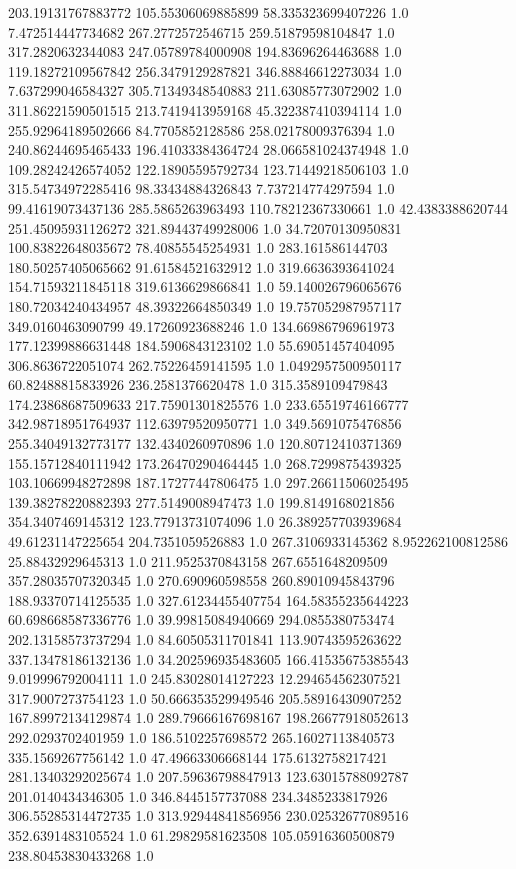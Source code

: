 203.19131767883772	105.55306069885899	58.335323699407226	1.0
7.472514447734682	267.2772572546715	259.51879598104847	1.0
317.2820632344083	247.05789784000908	194.83696264463688	1.0
119.18272109567842	256.3479129287821	346.88846612273034	1.0
7.637299046584327	305.71349348540883	211.63085773072902	1.0
311.86221590501515	213.7419413959168	45.322387410394114	1.0
255.92964189502666	84.7705852128586	258.02178009376394	1.0
240.86244695465433	196.41033384364724	28.066581024374948	1.0
109.28242426574052	122.18905595792734	123.71449218506103	1.0
315.54734972285416	98.33434884326843	7.737214774297594	1.0
99.41619073437136	285.5865263963493	110.78212367330661	1.0
42.4383388620744	251.45095931126272	321.89443749928006	1.0
34.72070130950831	100.83822648035672	78.40855545254931	1.0
283.161586144703	180.50257405065662	91.61584521632912	1.0
319.6636393641024	154.71593211845118	319.6136629866841	1.0
59.140026796065676	180.72034240434957	48.39322664850349	1.0
19.757052987957117	349.0160463090799	49.17260923688246	1.0
134.66986796961973	177.12399886631448	184.5906843123102	1.0
55.69051457404095	306.8636722051074	262.75226459141595	1.0
1.0492957500950117	60.82488815833926	236.2581376620478	1.0
315.3589109479843	174.23868687509633	217.75901301825576	1.0
233.65519746166777	342.98718951764937	112.63979520950771	1.0
349.5691075476856	255.34049132773177	132.4340260970896	1.0
120.80712410371369	155.15712840111942	173.26470290464445	1.0
268.7299875439325	103.10669948272898	187.17277447806475	1.0
297.26611506025495	139.38278220882393	277.5149008947473	1.0
199.8149168021856	354.3407469145312	123.77913731074096	1.0
26.389257703939684	49.61231147225654	204.7351059526883	1.0
267.3106933145362	8.952262100812586	25.88432929645313	1.0
211.9525370843158	267.6551648209509	357.28035707320345	1.0
270.690960598558	260.89010945843796	188.93370714125535	1.0
327.61234455407754	164.58355235644223	60.698668587336776	1.0
39.99815084940669	294.0855380753474	202.13158573737294	1.0
84.60505311701841	113.90743595263622	337.13478186132136	1.0
34.202596935483605	166.41535675385543	9.019996792004111	1.0
245.83028014127223	12.294654562307521	317.9007273754123	1.0
50.666353529949546	205.58916430907252	167.89972134129874	1.0
289.79666167698167	198.26677918052613	292.0293702401959	1.0
186.5102257698572	265.16027113840573	335.1569267756142	1.0
47.49663306668144	175.6132758217421	281.13403292025674	1.0
207.59636798847913	123.63015788092787	201.0140434346305	1.0
346.8445157737088	234.3485233817926	306.55285314472735	1.0
313.92944841856956	230.02532677089516	352.6391483105524	1.0
61.29829581623508	105.05916360500879	238.80453830433268	1.0

